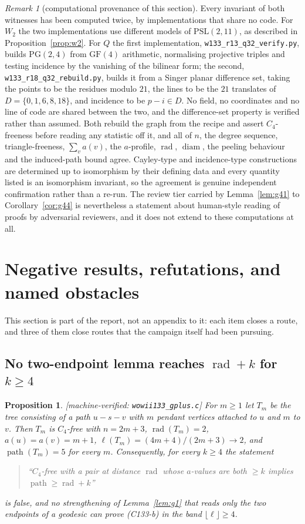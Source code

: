 \documentclass[11pt]{article}
\theoremstyle{plain}
\newtheorem{proposition}[theorem]{Proposition}
\theoremstyle{definition}
\theoremstyle{remark}
\newtheorem{remark}[theorem]{Remark}
\numberwithin{equation}{section}
\newcommand{\rad}{\operatorname{rad}}
\newcommand{\diam}{\operatorname{diam}}
\newcommand{\pth}{\operatorname{path}}
\newcommand{\statusbox}[1]{{\small\sloppy\textsf{[#1]}}}
\newcommand{\MV}[1]{\statusbox{machine-verified: \texttt{#1}}}
\begin{document}
\begin{remark}[computational provenance of this section]\label{rem:pocket2prov}
Every invariant of both witnesses has been computed twice, by implementations that share no
code. For $W_2$ the two implementations use different models of $\mathrm{PSL}(2,11)$, as
described in Proposition~\ref{prop:w2}. For $Q$ the first implementation,
\texttt{w133\_r13\_q32\_verify.py}, builds $\mathrm{PG}(2,4)$ from $\mathrm{GF}(4)$
arithmetic, normalising projective triples and testing incidence by the vanishing of the
bilinear form; the second, \texttt{w133\_r18\_q32\_rebuild.py}, builds it from a Singer
planar difference set, taking the points to be the residues modulo $21$, the lines to be the
$21$ translates of $D = \{0,1,6,8,18\}$, and incidence to be $p - i \in D$. No field, no
coordinates and no line of code are shared between the two, and the difference-set property is
verified rather than assumed. Both rebuild the graph from the recipe and assert
$C_4$-freeness before reading any statistic off it, and all of $n$, the degree sequence,
triangle-freeness, $\sum_v a(v)$, the $a$-profile, $\rad$, $\diam$, the peeling behaviour and
the induced-path bound agree. Cayley-type and incidence-type constructions are determined up
to isomorphism by their defining data and every quantity listed is an isomorphism invariant,
so the agreement is genuine independent confirmation rather than a re-run. The review tier
carried by Lemma~\ref{lem:g41} to Corollary~\ref{cor:g44} is nevertheless a statement about
human-style reading of proofs by adversarial reviewers, and it does not extend to these
computations at all.
\end{remark}

\section{Negative results, refutations, and named obstacles}\label{sec:limits}

This section is part of the report, not an appendix to it: each item closes a route, and
three of them close routes that the campaign itself had been pursuing.

\subsection{No two-endpoint lemma reaches $\rad + k$ for $k \ge 4$}

\begin{proposition}\label{prop:tm}
\MV{wowii133\_gplus.c}
For $m \ge 1$ let $T_m$ be the tree consisting of a path $u - s - v$ with $m$ pendant vertices
attached to $u$ and $m$ to $v$. Then $T_m$ is $C_4$-free with $n = 2m+3$, $\rad(T_m) = 2$,
$a(u) = a(v) = m+1$, $\ell(T_m) = (4m+4)/(2m+3) \to 2$, and $\pth(T_m) = 5$ for every $m$.
Consequently, for every $k \ge 4$ the statement
\begin{quote}
``$C_4$-free with a pair at distance $\rad$ whose $a$-values are both $\ge k$ implies
$\pth \ge \rad + k$''
\end{quote}
is false, and no strengthening of Lemma~\ref{lem:g1} that reads only the two endpoints of a
geodesic can prove (C133-b) in the band $\lfloor \ell\rfloor \ge 4$.
\end{proposition}
\end{document}
